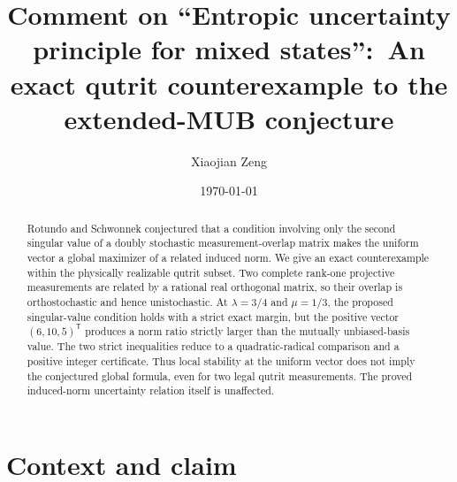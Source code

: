 \documentclass[aps,pra,reprint,superscriptaddress,nofootinbib,longbibliography]{revtex4-2}
\begin{document}
\title{Comment on ``Entropic uncertainty principle for mixed states'':\
An exact qutrit counterexample to the extended-MUB conjecture}

\author{Xiaojian Zeng}

\date{\today}

\begin{abstract}
Rotundo and Schwonnek conjectured that a condition involving only the second
singular value of a doubly stochastic measurement-overlap matrix makes the
uniform vector a global maximizer of a related induced norm.  We give an exact
counterexample within the physically realizable qutrit subset.  Two complete
rank-one projective measurements are related by a rational real orthogonal
matrix, so their overlap is orthostochastic and hence unistochastic.  At
$\lambda=3/4$ and $\mu=1/3$, the proposed singular-value condition holds with a
strict exact margin, but the positive vector $(6,10,5)^{\mathsf T}$ produces a
norm ratio strictly larger than the mutually unbiased-basis value.  The two
strict inequalities reduce to a quadratic-radical comparison and a positive
integer certificate.  Thus local stability at the uniform vector does not
imply the conjectured global formula, even for two legal qutrit measurements.
The proved induced-norm uncertainty relation itself is unaffected.
\end{abstract}

\maketitle

\section{Context and claim}
\end{document}
